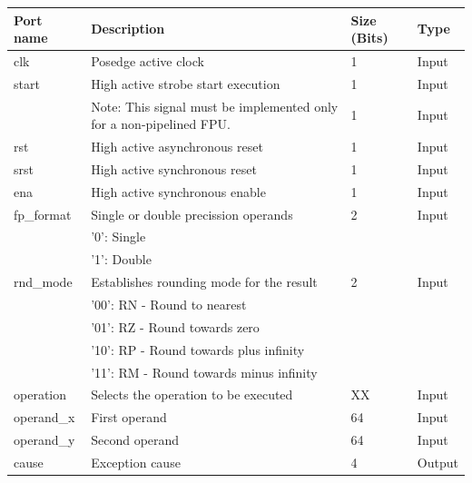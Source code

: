 \begin{table}
\begin{center}
\begin{tabu}{|X[l]|X[3,l]|X[c]|X[c]|}
\hline
\rowfont[c]\bfseries
Port name & Description & Size (Bits) & Type\\
\hline
\hline
clk                & Posedge active clock                         & 1  & Input   \\
\hline
start              & High active strobe start execution           & 1  & Input   \\
                   & Note: This signal must be implemented only for a non-pipelined FPU. & 1  & Input   \\
\hline
rst                & High active asynchronous reset               & 1  & Input   \\
\hline
srst               & High active synchronous reset                & 1  & Input   \\
\hline
ena		   & High active synchronous enable		  & 1  & Input \\
\hline
fp\_format         & Single or double precission operands         & 2  & Input   \\
                   & '0': Single                                  &    &         \\
                   & '1': Double                                  &    &         \\
\hline
rnd\_mode          & Establishes rounding mode for the result     & 2  & Input   \\
                   & '00': RN - Round to nearest                  &    &         \\
                   & '01': RZ - Round towards zero                &    &         \\
                   & '10': RP - Round towards plus infinity       &    &         \\
                   & '11': RM - Round towards minus infinity      &    &         \\
\hline
operation          & Selects the operation to be executed         & XX & Input   \\
\hline
operand\_x         & First operand                                & 64 & Input   \\
\hline
operand\_y         & Second operand                               & 64 & Input   \\
\hline
cause              & Exception cause                              & 4  & Output  \\

\end{tabu}
\end{center}
\end{table}

